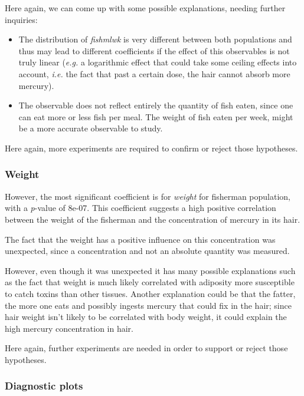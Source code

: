 \documentclass[12pt,]{article}
\begin{document}
Here again, we can come up with some possible explanations, needing
further inquiries:

\begin{itemize}
\item
  The distribution of \emph{fishmlwk} is very different between both
  populations and thus may lead to different coefficients if the effect
  of this observables is not truly linear (\emph{e.g.} a logarithmic
  effect that could take some ceiling effects into account, \emph{i.e.}
  the fact that past a certain dose, the hair cannot absorb more
  mercury).
\item
  The observable does not reflect entirely the quantity of fish eaten,
  since one can eat more or less fish per meal. The weight of fish eaten
  per week, might be a more accurate observable to study.
\end{itemize}

Here again, more experiments are required to confirm or reject those
hypotheses.

\subsubsection{Weight}\label{weight}

However, the most significant coefficient is for \emph{weight} for
fisherman population, with a \emph{p}-value of 8e-07. This coefficient
suggests a high positive correlation between the weight of the fisherman
and the concentration of mercury in its hair.

The fact that the weight has a positive influence on this concentration
was unexpected, since a concentration and not an absolute quantity was
measured.

However, even though it was unexpected it has many possible explanations
such as the fact that weight is much likely correlated with adiposity
more susceptible to catch toxins than other tissues. Another explanation
could be that the fatter, the more one eats and possibly ingests mercury
that could fix in the hair; since hair weight isn't likely to be
correlated with body weight, it could explain the high mercury
concentration in hair.

Here again, further experiments are needed in order to support or reject
those hypotheses.

\subsubsection{Diagnostic plots}\label{diagnostic-plots}
\end{document}
